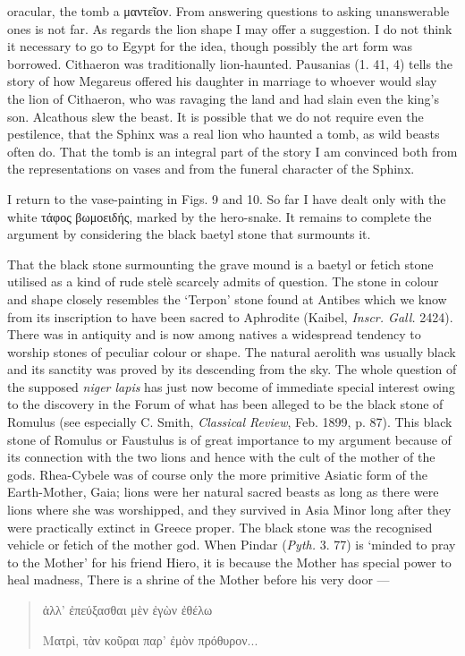 \documentclass[a4paper, 11pt, oneside, polutonikogreek, english]{article}
\begin{document}
oracular, the tomb a μαντεῖον. From answering questions to asking unanswerable ones is not far. As regards the lion shape I may offer a suggestion. I do not think it necessary to go to Egypt for the idea, though possibly the art form was borrowed. Cithaeron was traditionally lion-haunted. Pausanias (1. 41, 4) tells the story of how Megareus offered his daughter in marriage to whoever would slay the lion of Cithaeron, who was ravaging the land and had slain even the king's son. Alcathous slew the beast. It is possible that we do not require even the pestilence, that the Sphinx was a real lion who haunted a tomb, as wild beasts often do. That the tomb is an integral part of the story I am convinced both from the representations on vases and from the funeral character of the Sphinx.

I return to the vase-painting in Figs. 9 and 10. So far I have dealt only with the white τάφος βωμοειδής, marked by the hero-snake. It remains to complete the argument by considering the black baetyl stone that surmounts it.

That the black stone surmounting the grave mound is a baetyl or fetich stone utilised as a kind of rude stelè scarcely admits of question. The stone in colour and shape closely resembles the `Terpon' stone found at Antibes which we know from its inscription to have been sacred to Aphrodite (Kaibel, \emph{Inscr. Gall.} 2424). There was in antiquity and is now among natives a widespread tendency to worship stones of peculiar colour or shape. The natural aerolith was usually black and its sanctity was proved by its descending from the sky. The whole question of the supposed \emph{niger lapis} has just now become of immediate special interest owing to the discovery in the Forum of what has been alleged to be the black stone of Romulus (see especially C. Smith, \emph{Classical Review}, Feb. 1899, p. 87). This black stone of Romulus or Faustulus is of great importance to my argument because of its connection with the two lions and hence with the cult of the mother of the gods. Rhea-Cybele was of course only the more primitive Asiatic form of the Earth-Mother, Gaia; lions were her natural sacred beasts as long as there were lions where she was worshipped, and they survived in Asia Minor long after they were practically extinct in Greece proper. The black stone was the recognised vehicle or fetich of the mother god. When Pindar (\emph{Pyth.} 3. 77) is `minded to pray to the Mother' for his friend Hiero, it is because the Mother has special power to heal madness, There is a shrine of the Mother before his very door ---
\begin{quotation}
\large
ἀλλ' ἐπεύξασθαι μὲν ἐγὼν ἐθέλω

Ματρὶ, τὰν κοῦραι παρ' ἐμὸν πρόθυρον...
\end{quotation}
\end{document}
